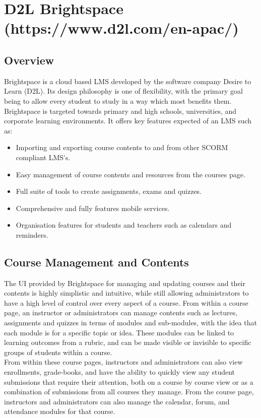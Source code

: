 \section{D2L Brightspace (https://www.d2l.com/en-apac/)}
\subsection{Overview}
Brightspace is a cloud based LMS developed by the software company Desire to Learn (D2L). Its design philosophy is one of flexibility, with the primary goal being to allow every student to study in a way which most benefits them. Brightspace is targeted towards primary and high schools, universities, and corporate learning environments. It offers key features expected of an LMS such as:
\begin{itemize}
  \item Importing and exporting course contents to and from other SCORM compliant LMS's.
  \item Easy management of course contents and resources from the courses page.
  \item Full suite of tools to create assignments, exams and quizzes.
  \item Comprehensive and fully features mobile services.
  \item Organisation features for students and teachers such as calendars and reminders.
\end{itemize}
\cite{brightspaceLMS}

\subsection{Course Management and Contents}
The UI provided by Brightspace for managing and updating courses and their contents is highly simplistic and intuitive, while still allowing administrators to have a high level of control over every aspect of a course. From within a course page, an instructor or administrators can manage contents such as lectures, assignments and quizzes in terms of modules and sub-modules, with the idea that each module is for a specific topic or idea. These modules can be linked to learning outcomes from a rubric, and can be made visible or invisible to specific groups of students within a course.\\ 
From within these course pages, instructors and administrators can also view enrollments, grade-books, and have the ability to quickly view any student submissions that require their attention, both on a course by course view or as a combination of submissions from all courses they manage. From the course page, instructors and administrators can also manage the calendar, forum, and attendance modules for that course.


